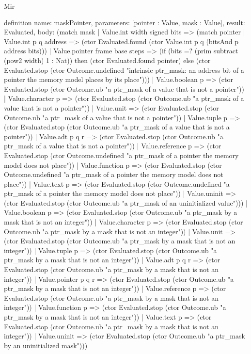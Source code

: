 \begin{lexlean}{Mir}
\begin{semanticmodule}
definition{
  name: maskPointer,
  parameters: [pointer : Value, mask : Value],
  result: Evaluated,
  body: (match mask
    | Value.int width signed bits => (match pointer
      | Value.int p q address => (ctor Evaluated.found (ctor Value.int p q (bitsAnd p address bits)))
      | Value.pointer frame base steps => (if (bits =? (prim subtract (pow2 width) 1 : Nat)) then (ctor Evaluated.found pointer) else (ctor Evaluated.stop (ctor Outcome.undefined "intrinsic ptr_mask: an address bit of a pointer the memory model places by its place")))
      | Value.boolean p => (ctor Evaluated.stop (ctor Outcome.ub "a ptr_mask of a value that is not a pointer"))
      | Value.character p => (ctor Evaluated.stop (ctor Outcome.ub "a ptr_mask of a value that is not a pointer"))
      | Value.unit => (ctor Evaluated.stop (ctor Outcome.ub "a ptr_mask of a value that is not a pointer"))
      | Value.tuple p => (ctor Evaluated.stop (ctor Outcome.ub "a ptr_mask of a value that is not a pointer"))
      | Value.adt p q r => (ctor Evaluated.stop (ctor Outcome.ub "a ptr_mask of a value that is not a pointer"))
      | Value.reference p => (ctor Evaluated.stop (ctor Outcome.undefined "a ptr_mask of a pointer the memory model does not place"))
      | Value.function p => (ctor Evaluated.stop (ctor Outcome.undefined "a ptr_mask of a pointer the memory model does not place"))
      | Value.text p => (ctor Evaluated.stop (ctor Outcome.undefined "a ptr_mask of a pointer the memory model does not place"))
      | Value.uninit => (ctor Evaluated.stop (ctor Outcome.ub "a ptr_mask of an uninitialized value")))
    | Value.boolean p => (ctor Evaluated.stop (ctor Outcome.ub "a ptr_mask by a mask that is not an integer"))
    | Value.character p => (ctor Evaluated.stop (ctor Outcome.ub "a ptr_mask by a mask that is not an integer"))
    | Value.unit => (ctor Evaluated.stop (ctor Outcome.ub "a ptr_mask by a mask that is not an integer"))
    | Value.tuple p => (ctor Evaluated.stop (ctor Outcome.ub "a ptr_mask by a mask that is not an integer"))
    | Value.adt p q r => (ctor Evaluated.stop (ctor Outcome.ub "a ptr_mask by a mask that is not an integer"))
    | Value.pointer p q r => (ctor Evaluated.stop (ctor Outcome.ub "a ptr_mask by a mask that is not an integer"))
    | Value.reference p => (ctor Evaluated.stop (ctor Outcome.ub "a ptr_mask by a mask that is not an integer"))
    | Value.function p => (ctor Evaluated.stop (ctor Outcome.ub "a ptr_mask by a mask that is not an integer"))
    | Value.text p => (ctor Evaluated.stop (ctor Outcome.ub "a ptr_mask by a mask that is not an integer"))
    | Value.uninit => (ctor Evaluated.stop (ctor Outcome.ub "a ptr_mask by an uninitialized mask")))
}


\end{semanticmodule}
\end{lexlean}
